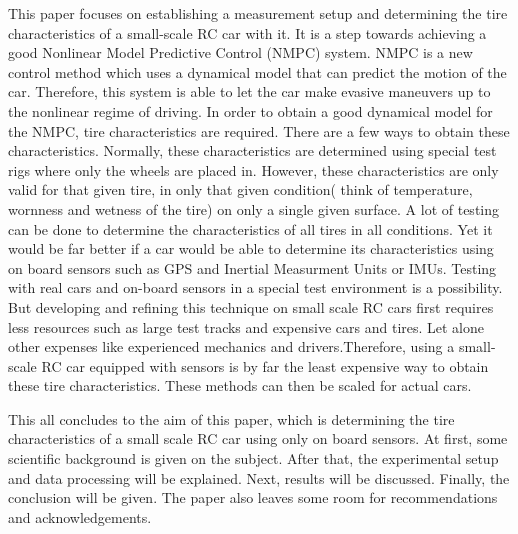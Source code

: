This paper focuses on establishing a measurement setup and determining the tire characteristics of a small-scale RC car with it. It is a step towards achieving a good Nonlinear Model Predictive Control (NMPC) system. NMPC is a new control method which uses a dynamical model that can predict the motion of the car. Therefore, this system is able to let the car make evasive maneuvers up to the nonlinear regime of driving. In order to obtain a good dynamical model for the NMPC, tire characteristics are required. There are a few ways to obtain these characteristics. Normally, these characteristics are determined using special test rigs where only the wheels are placed in. However, these characteristics are only valid for that given tire, in only that given condition( think of temperature, wornness and wetness of the tire) on only a single given surface. A lot of testing can be done to determine the characteristics of all tires in all conditions. Yet it would be far better if a car would be able to determine it\textquotesingle s characteristics using on board sensors such as GPS and Inertial Measurment Units or IMU\textquotesingle s. Testing with real cars and on-board sensors in a special test environment is a possibility. But developing and refining this technique on small scale RC cars first requires less resources such as large test tracks and expensive cars and tires. Let alone other expenses like experienced mechanics and drivers.Therefore, using a small-scale RC car equipped with sensors is by far the least expensive way to obtain these tire characteristics. These methods can then be scaled for actual cars.

This all concludes to the aim of this paper, which is determining the tire characteristics of a small scale RC car using only on board sensors. At first, some scientific background is given on the subject. After that, the experimental setup and data processing will be explained. Next, results will be discussed. Finally, the conclusion will be given. The paper also leaves some room for recommendations and acknowledgements.  

